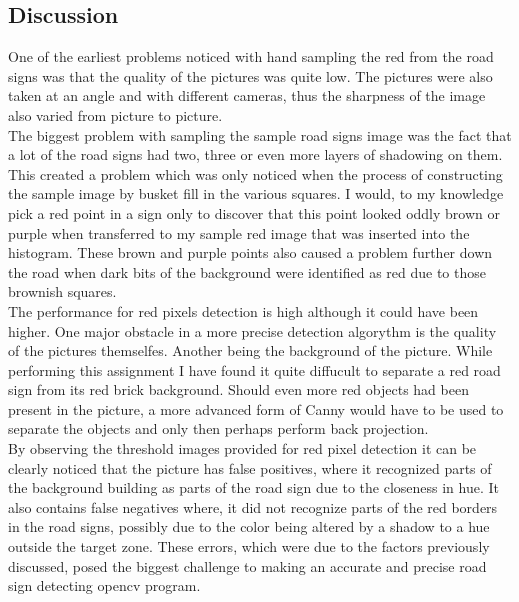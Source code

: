 \documentclass{article}
\begin{document}
\subsection{Discussion}\label{sec:intro}
One of the earliest problems noticed with hand sampling the red from the road signs was that the quality of the pictures was quite low. The pictures were also taken at an angle and with different cameras, thus the sharpness of the image also varied from picture to picture. \\

The biggest problem with sampling the sample road signs image was the fact that a lot of the road signs had two, three or even more layers of shadowing on them. This created a problem which was only noticed when the process of constructing the sample image by busket fill in the various squares. I would, to my knowledge pick a red point in a sign only to discover that this point looked oddly brown or purple when transferred to my sample red image that was inserted into the histogram. These brown and purple points also caused a problem further down the road when dark bits of the background were identified as red due to those brownish squares.\\


The performance for red pixels detection is high although it could have been higher. One major obstacle in a more precise detection algorythm is the quality of the pictures themselfes. Another being the background of the picture. While performing this assignment I have found it quite diffucult to separate a red road sign from its red brick background. Should even more red objects had been present in the picture, a more advanced form of Canny would have to be used to separate the objects and only then perhaps perform back projection.\\


By observing the threshold images provided for red pixel detection it can be clearly noticed that the picture has false positives, where it recognized parts of the background building as parts of the road sign due to the closeness in hue. It also contains false negatives where, it did not recognize parts of the red borders in the road signs, possibly due to the color being altered by a shadow to a hue outside the target zone. These errors, which were due to the factors previously discussed, posed the biggest challenge to making an accurate and precise road sign detecting opencv program.\\
\end{document}
